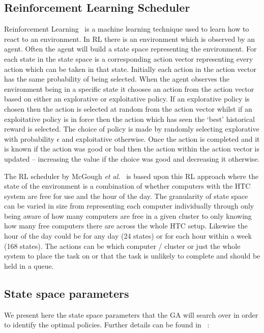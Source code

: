 \documentclass[10pt, conference, compsocconf]{IEEEtran}
\begin{document}


\subsection{Reinforcement Learning Scheduler}

Reinforcement Learning~\cite{rl} is a machine learning technique used to learn how to react to an environment. In RL there is an environment which is observed by an agent. Often the agent will build a state space representing the environment. For each state in the state space is a corresponding action vector representing every action which can be taken in that state. Initially each action in the action vector has the same probability of being selected. When the agent observes the environment being in a specific state it chooses an action from the action vector based on either an explorative or exploitative policy. If an explorative policy is chosen then the action is selected at random from the action vector whilst if an exploitative policy is in force then the action which has seen the `best' historical reward is selected. The choice of policy is made by randomly selecting explorative with probability $\epsilon$ and exploitative otherwise. Once the action is completed and it is known if the action was good or bad then the action within the action vector is updated -- increasing the value if the choice was good and decreasing it otherwise.

The RL scheduler by McGough {\em et al.}~\cite{suscom} is based upon this RL approach where the state of the environment is a combination of whether computers with the HTC system are free for use and the hour of the day. The granularity of state space can be varied in size from representing each computer individually through only being aware of how many computers are free in a given cluster to only knowing how many free computers there are across the whole HTC setup. Likewise the hour of the day could be for any day (24 states) or for each hour within a week (168 states). The actions can be which computer / cluster or just the whole system to place the task on or that the task is unlikely to complete and should be held in a queue.			


\subsection{State space parameters}
We present here the state space parameters that the GA will search over in order to identify the optimal policies. Further details can be found in ~\cite{suscom}:
\end{document}
